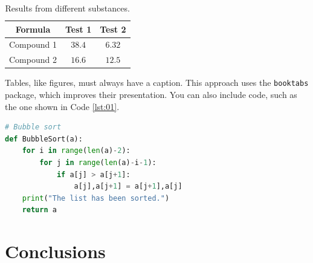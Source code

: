 \documentclass[11pt]{article}
\begin{document}
\begin{table}[H]
    \centering\small
    \begin{tabular}{@{}ccc@{}}
    \toprule
        \textbf{Formula} & \textbf{Test 1} & \textbf{Test 2} \\ 
    \midrule
        Compound 1 & $38.4$  &  $6.32$\\ 
        Compound 2 & $16.6$ & $12.5$ \\ 
    \bottomrule
    \end{tabular}
    \caption{Results from different substances.}
    \label{tab:01}
\end{table}

Tables, like figures, must always have a caption. This approach uses the \texttt{booktabs} package, which improves their presentation. You can also include code, such as the one shown in Code \ref{lst:01}.




\begin{lstlisting}[language=Python,caption={Example of code},label={lst:01},captionpos=b]
# Bubble sort 
def BubbleSort(a):
    for i in range(len(a)-2):
        for j in range(len(a)-i-1):
            if a[j] > a[j+1]:
                a[j],a[j+1] = a[j+1],a[j]
    print("The list has been sorted.")
    return a
\end{lstlisting}

\section{Conclusions}
\end{document}
